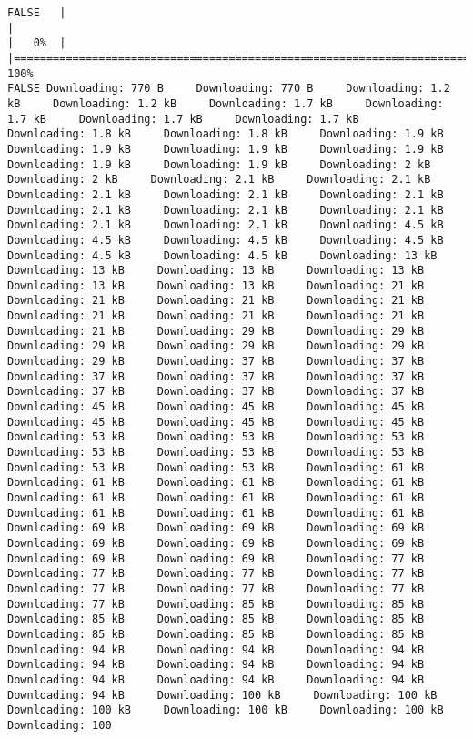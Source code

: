 \documentclass[
  12pt,
  portuguese,
]{report}
\begin{document}
\begin{verbatim}
FALSE   |                                                                              |                                                                      |   0%  |                                                                              |======================================================================| 100%
FALSE Downloading: 770 B     Downloading: 770 B     Downloading: 1.2 kB     Downloading: 1.2 kB     Downloading: 1.7 kB     Downloading: 1.7 kB     Downloading: 1.7 kB     Downloading: 1.7 kB     Downloading: 1.8 kB     Downloading: 1.8 kB     Downloading: 1.9 kB     Downloading: 1.9 kB     Downloading: 1.9 kB     Downloading: 1.9 kB     Downloading: 1.9 kB     Downloading: 1.9 kB     Downloading: 2 kB     Downloading: 2 kB     Downloading: 2.1 kB     Downloading: 2.1 kB     Downloading: 2.1 kB     Downloading: 2.1 kB     Downloading: 2.1 kB     Downloading: 2.1 kB     Downloading: 2.1 kB     Downloading: 2.1 kB     Downloading: 2.1 kB     Downloading: 2.1 kB     Downloading: 4.5 kB     Downloading: 4.5 kB     Downloading: 4.5 kB     Downloading: 4.5 kB     Downloading: 4.5 kB     Downloading: 4.5 kB     Downloading: 13 kB     Downloading: 13 kB     Downloading: 13 kB     Downloading: 13 kB     Downloading: 13 kB     Downloading: 13 kB     Downloading: 21 kB     Downloading: 21 kB     Downloading: 21 kB     Downloading: 21 kB     Downloading: 21 kB     Downloading: 21 kB     Downloading: 21 kB     Downloading: 21 kB     Downloading: 29 kB     Downloading: 29 kB     Downloading: 29 kB     Downloading: 29 kB     Downloading: 29 kB     Downloading: 29 kB     Downloading: 37 kB     Downloading: 37 kB     Downloading: 37 kB     Downloading: 37 kB     Downloading: 37 kB     Downloading: 37 kB     Downloading: 37 kB     Downloading: 37 kB     Downloading: 45 kB     Downloading: 45 kB     Downloading: 45 kB     Downloading: 45 kB     Downloading: 45 kB     Downloading: 45 kB     Downloading: 53 kB     Downloading: 53 kB     Downloading: 53 kB     Downloading: 53 kB     Downloading: 53 kB     Downloading: 53 kB     Downloading: 53 kB     Downloading: 53 kB     Downloading: 61 kB     Downloading: 61 kB     Downloading: 61 kB     Downloading: 61 kB     Downloading: 61 kB     Downloading: 61 kB     Downloading: 61 kB     Downloading: 61 kB     Downloading: 61 kB     Downloading: 61 kB     Downloading: 69 kB     Downloading: 69 kB     Downloading: 69 kB     Downloading: 69 kB     Downloading: 69 kB     Downloading: 69 kB     Downloading: 69 kB     Downloading: 69 kB     Downloading: 77 kB     Downloading: 77 kB     Downloading: 77 kB     Downloading: 77 kB     Downloading: 77 kB     Downloading: 77 kB     Downloading: 77 kB     Downloading: 77 kB     Downloading: 85 kB     Downloading: 85 kB     Downloading: 85 kB     Downloading: 85 kB     Downloading: 85 kB     Downloading: 85 kB     Downloading: 85 kB     Downloading: 85 kB     Downloading: 94 kB     Downloading: 94 kB     Downloading: 94 kB     Downloading: 94 kB     Downloading: 94 kB     Downloading: 94 kB     Downloading: 94 kB     Downloading: 94 kB     Downloading: 94 kB     Downloading: 94 kB     Downloading: 100 kB     Downloading: 100 kB     Downloading: 100 kB     Downloading: 100 kB     Downloading: 100 kB     Downloading: 100 
\end{verbatim}
\end{document}
